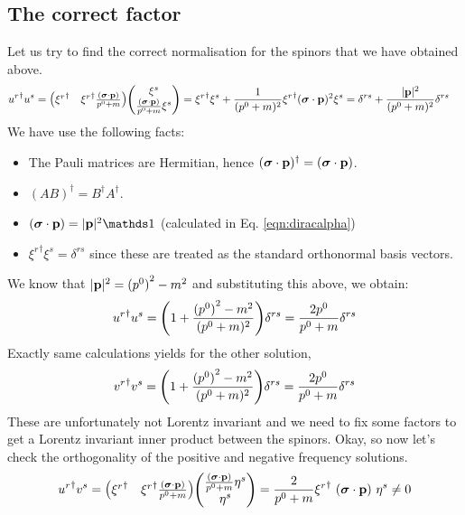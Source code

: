 \subsection{The correct factor}
Let us try to find the correct normalisation for the spinors that we have obtained above. 
\begin{align*}
    {u^r}^\dagger u^s &=\mqty({\xi^r}^\dagger & {\xi^r}^\dagger\frac{(\bs{\sigma}\cdot \vb{p})}{{p^0}+m})  \mqty(\xi^s \\ \frac{(\bs{\sigma}\cdot \vb{p})}{{p^0}+m}\xi^s) = {\xi^r}^\dagger{\xi^s} + \frac{1}{({p^0}+m)^2}{\xi^r}^\dagger(\bs{\sigma}\cdot \vb{p})^2 {\xi^s} = \delta^{rs} + \frac{|\vb{p}|^2}{({p^0}+m)^2}\delta^{rs}
\end{align*}
We have use the following facts:
\begin{itemize}
    \item[$\vartriangleright$]  The Pauli matrices are Hermitian, hence $(\boldsymbol{\sigma}\cdot \vb{p})^\dagger = (\boldsymbol{\sigma}\cdot \vb{p})$.
    \item[$\vartriangleright$] $(AB)^\dagger = B^\dagger A^\dagger$. 
     \item[$\vartriangleright$] $(\bs{\sigma}\cdot \vb{p}) = |\vb{p}|^2 \iden$ (calculated in Eq. \ref{eqn:diracalpha})
     \item[$\vartriangleright$] ${\xi^r}^\dagger \xi^s = \delta^{rs}$ since these are treated as the standard orthonormal basis vectors.  
\end{itemize}
We know that $|\vb{p}|^2 = {(p^0)}^2 - m^2$ and substituting this above, we obtain:
\begin{align}
    {u^r}^\dagger u^s = \qty(1 + \frac{{(p^0)}^2-m^2}{(p^0 + m)^2}) \delta^{rs} = \frac{2p^0}{p^0+m}\delta^{rs}
\end{align}
Exactly same calculations yields for the other solution,
\begin{align}
    {v^r}^\dagger v^s = \qty(1 + \frac{{(p^0)}^2-m^2}{(p^0 + m)^2}) \delta^{rs} = \frac{2p^0}{p^0+m}\delta^{rs}
\end{align}
These are unfortunately not Lorentz invariant and we need to fix some factors to get a Lorentz invariant inner product between the spinors. Okay, so now let's check the orthogonality of the positive and negative frequency solutions.
\begin{align}\label{eqn:hehe1}
    {u^r}^\dagger v^s = \mqty({\xi^r}^\dagger & {\xi^r}^\dagger\frac{(\bs{\sigma}\cdot \vb{p})}{{p^0}+m}) \mqty(\frac{(\bs{\sigma}\cdot \vb{p})}{{p^0}+m}\eta^s\\ \eta^s) = \frac{2}{p^0+m}  {\xi^r}^\dagger\ (\bs{\sigma}\cdot\vb{p})\ \eta^s \neq 0
\end{align}
